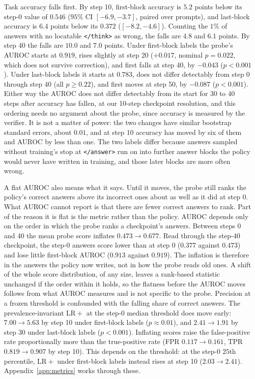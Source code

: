 \documentclass{article}
\begin{document}
Task accuracy falls first. By step 10, first-block accuracy is $5.2$ points below its step-0 value of $0.546$ ($95\%$ CI $[-6.9, -3.7]$, paired over prompts), and last-block accuracy is $6.4$ points below its $0.372$ ($[-8.2, -4.6]$). Counting the $1\%$ of answers with no locatable \texttt{</think>} as wrong, the falls are $4.8$ and $6.1$ points. By step 40 the falls are $10.0$ and $7.0$ points. Under first-block labels the probe's AUROC starts at $0.919$, rises slightly at step 20 ($+0.017$, nominal $p=0.022$, which does not survive correction), and first falls at step 40, by $-0.043$ ($p<0.001$). Under last-block labels it starts at $0.783$, does not differ detectably from step 0 through step 40 (all $p \geq 0.22$), and first moves at step 50, by $-0.087$ ($p < 0.001$). Either way the AUROC does not differ detectably from its start for 30 to 40 steps after accuracy has fallen, at our 10-step checkpoint resolution, and this ordering needs no argument about the probe, since accuracy is measured by the verifier. It is not a matter of power: the two changes have similar bootstrap standard errors, about $0.01$, and at step 10 accuracy has moved by six of them and AUROC by less than one. The two labels differ because answers sampled without training's stop at \texttt{</answer>} run on into further answer blocks the policy would never have written in training, and those later blocks are more often wrong.

A flat AUROC also means what it says. Until it moves, the probe still ranks the policy's correct answers above its incorrect ones about as well as it did at step 0. What AUROC cannot report is that there are fewer correct answers to rank. Part of the reason it is flat is the metric rather than the policy. AUROC depends only on the order in which the probe ranks a checkpoint's answers. Between steps 0 and 40 the mean probe score inflates $0.473 \to 0.677$. Read through the step-40 checkpoint, the step-0 answers score lower than at step 0 ($0.377$ against $0.473$) and lose little first-block AUROC ($0.913$ against $0.919$). The inflation is therefore in the answers the policy now writes, not in how the probe reads old ones. A shift of the whole score distribution, of any size, leaves a rank-based statistic unchanged if the order within it holds, so the flatness before the AUROC moves follows from what AUROC measures and is not specific to the probe. Precision at a frozen threshold is confounded with the falling share of correct answers. The prevalence-invariant $\mathrm{LR}+$ at the step-0 median threshold does move early: $7.00 \to 5.63$ by step 10 under first-block labels ($p\approx 0.01$), and $2.41 \to 1.91$ by step 30 under last-block labels ($p<0.001$). Inflating scores raise the false-positive rate proportionally more than the true-positive rate (FPR $0.117 \to 0.161$, TPR $0.819 \to 0.907$ by step 10). This depends on the threshold: at the step-0 $25$th percentile, $\mathrm{LR}+$ under first-block labels instead rises at step 10 ($2.03 \to 2.41$). Appendix~\ref{app:metrics} works through these.
\end{document}
